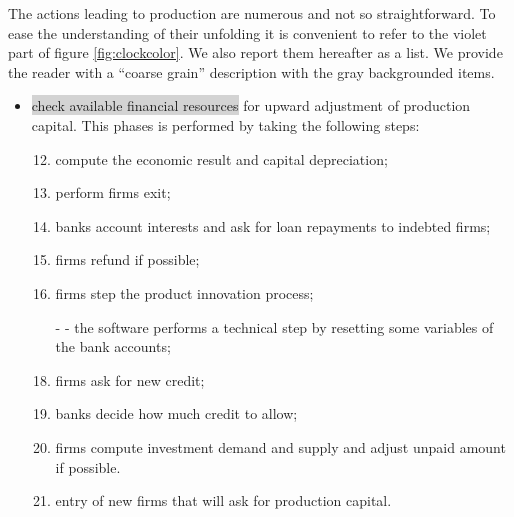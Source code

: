 \documentclass{book}
\begin{document}
The actions leading to production are numerous and not so straightforward. To ease the understanding of their unfolding it is convenient to refer to the violet part of figure \ref{fig:clockcolor}. We also report them hereafter as a list. We provide the reader with a ``coarse grain'' description with the gray backgrounded items.

\begin{itemize}
	\item \colorbox{lightgray}{check available financial resources} for upward adjustment of production capital. This phases is performed by taking the following steps:

\begin{enumerate}
		\setcounter{enumi}{11}
	\item compute the economic result and capital depreciation;
	\item perform firms exit;
	\item banks account interests and ask for loan repayments to indebted firms;
	\item firms refund if possible;
	\item firms step the product innovation process;
	\item[- - ] the software performs a technical step by resetting some variables of the bank accounts;
	\item firms ask for new credit;
	\item banks decide how much credit to allow;
	\item firms compute investment demand and supply and adjust unpaid amount if possible.
	\item entry of new firms that will ask for production capital.
\end{enumerate}



\end{itemize}
\end{document}
